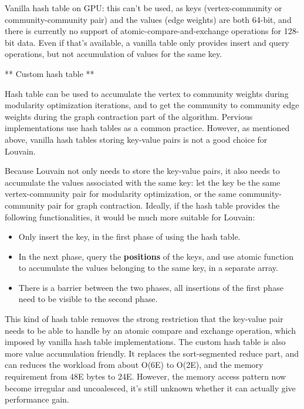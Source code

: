 \documentclass[10pt,article,oneside]{memoir}
\begin{document}
Vanilla hash table on GPU: this can't be used, as keys (vertex-community
or community-community pair) and the values (edge weights) are both
64-bit, and there is currently no support of atomic-compare-and-exchange
operations for 128-bit data. Even if that's available, a vanilla table
only provides insert and query operations, but not accumulation of
values for the same key.

** Custom hash table **

Hash table can be used to accumulate the vertex to community weights
during modularity optimization iterations, and to get the community to
community edge weights during the graph contraction part of the
algorithm. Pervious implementations use hash tables as a common
practice. However, as mentioned above, vanilla hash tables storing
key-value pairs is not a good choice for Louvain.

Because Louvain not only needs to store the key-value pairs, it also
needs to accumulate the values associated with the same key: let the key
be the same vertex-community pair for modularity optimization, or the
same community-community pair for graph contraction. Ideally, if the
hash table provides the following functionalities, it would be much more
suitable for Louvain:

\begin{itemize}
\itemsep1pt\parskip0pt
\item
  Only insert the key, in the first phase of using the hash table.
\item
  In the next phase, query the \textbf{positions} of the keys, and use
  atomic function to accumulate the values belonging to the same key, in
  a separate array.
\item
  There is a barrier between the two phases, all insertions of the first
  phase need to be visible to the second phase.
\end{itemize}

This kind of hash table removes the strong restriction that the
key-value pair needs to be able to handle by an atomic compare and
exchange operation, which imposed by vanilla hash table implementations.
The custom hash table is also more value accumulation friendly. It
replaces the sort-segmented reduce part, and can reduces the workload
from about O(6\textbar{}E\textbar{}) to O(2\textbar{}E\textbar{}), and
the memory requirement from 48\textbar{}E\textbar{} bytes to
24\textbar{}E\textbar{}. However, the memory access pattern now become
irregular and uncoalesced, it's still unknown whether it can actually
give performance gain.
\end{document}
